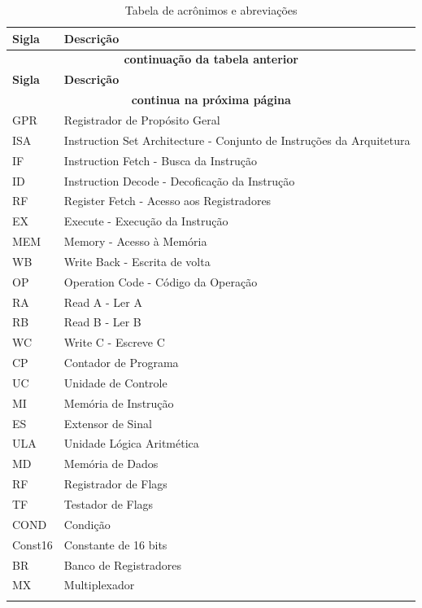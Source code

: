 \documentclass{report}
\begin{document}
\begin{center}
\begin{longtable}[pos]{|m{52pt} | m{350pt}|} \hline
	\cellcolor[gray]{0.9} \textbf{Sigla} & \cellcolor[gray]{0.9}\textbf{Descrição}\\ \hline \endfirsthead \hline
	\multicolumn{2}{|c|}{{\bfseries \textbf{continuação da tabela anterior}}} \\ \hline
	\cellcolor[gray]{0.9} \textbf{Sigla} & \cellcolor[gray]{0.9}\textbf{Descrição}\\ \hline \endhead
	\multicolumn{2}{|c|}{{\textbf{continua na próxima página}}} \\ \hline \endfoot
	\hline \endlastfoot
	
    GPR     & Registrador de Propósito Geral\\ \hline
    ISA     & Instruction Set Architecture - Conjunto de Instruções da Arquitetura\\ \hline
    IF      & Instruction Fetch - Busca da Instrução  \\ \hline
    ID      & Instruction Decode - Decoficação da Instrução \\ \hline
    RF      & Register Fetch -  Acesso aos Registradores\\ \hline
    EX      & Execute - Execução da Instrução\\ \hline
    MEM     & Memory - Acesso à Memória\\ \hline
    WB      & Write Back - Escrita de volta\\ \hline
    OP      & Operation Code - Código da Operação\\ \hline
    RA      & Read A - Ler A\\ \hline
    RB      & Read B - Ler B\\ \hline
    WC      & Write C - Escreve C\\ \hline
    CP      & Contador de Programa\\ \hline
    UC      & Unidade de Controle\\ \hline
    MI      & Memória de Instrução\\ \hline
    ES      & Extensor de Sinal\\ \hline
    ULA     & Unidade Lógica Aritmética\\ \hline
    MD      & Memória de Dados\\ \hline
    RF      & Registrador de Flags\\ \hline
    TF      & Testador de Flags\\ \hline
    COND    & Condição\\ \hline
    Const16 & Constante de 16 bits \\ \hline
    BR      & Banco de Registradores\\ \hline
    MX      & Multiplexador\\ \hline

\caption{Tabela de acrônimos e abreviações}
\end{longtable}
\end{center}
\end{document}
